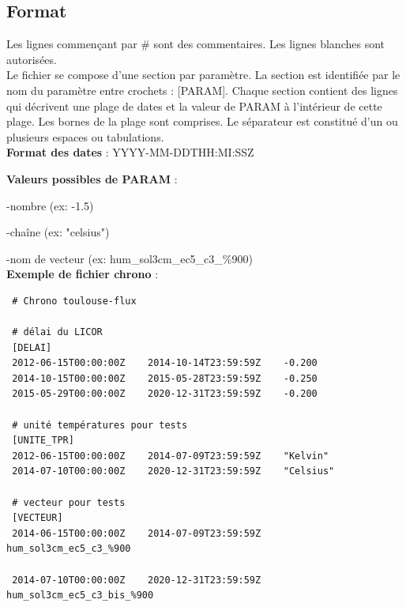 \subsection{Format}
 Les lignes commençant par \# sont des commentaires.
 Les lignes blanches sont autorisées.
 \\
 
 Le fichier se compose d'une section par paramètre. La section est identifiée par le nom du paramètre entre crochets : [PARAM].
 Chaque section contient des lignes qui décrivent une plage de dates et la valeur de PARAM à l'intérieur de cette plage. Les bornes de la plage sont comprises. Le séparateur est constitué d'un ou plusieurs espaces ou tabulations.
 \\
 
 \textbf{Format des dates} : YYYY-MM-DDTHH:MI:SSZ
 
 \textbf{Valeurs possibles de PARAM} :
 
 -nombre (ex: -1.5)
        
 -chaîne (ex: "celsius")
      
 -nom de vecteur (ex: hum\_sol3cm\_ec5\_c3\_\%900)
 \\
 
 
 \textbf{Exemple de fichier chrono} : 
 
 \begin{lstlisting}
 # Chrono toulouse-flux
 
 # délai du LICOR
 [DELAI]
 2012-06-15T00:00:00Z    2014-10-14T23:59:59Z    -0.200
 2014-10-15T00:00:00Z    2015-05-28T23:59:59Z    -0.250
 2015-05-29T00:00:00Z    2020-12-31T23:59:59Z    -0.200
 
 # unité températures pour tests
 [UNITE_TPR]
 2012-06-15T00:00:00Z    2014-07-09T23:59:59Z    "Kelvin"
 2014-07-10T00:00:00Z    2020-12-31T23:59:59Z    "Celsius"
 
 # vecteur pour tests
 [VECTEUR]
 2014-06-15T00:00:00Z    2014-07-09T23:59:59Z    hum_sol3cm_ec5_c3_%900

 2014-07-10T00:00:00Z    2020-12-31T23:59:59Z    hum_sol3cm_ec5_c3_bis_%900
 \end{lstlisting}

 \saute 
 
 
